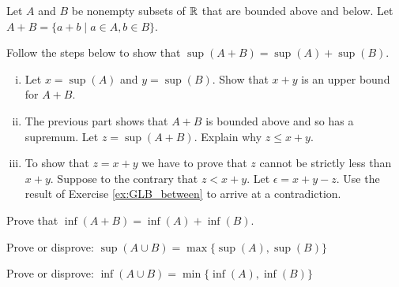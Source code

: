 \item Let $A$ and $B$ be nonempty subsets of $\mathbb{R}$ that are bounded above and below. Let $A+B = \{a+b \mid a \in A, b \in B\}$. 

\ba

\item Follow the steps below to show that $\sup(A+B) = \sup(A) + \sup(B)$.
	\begin{enumerate}[i.]
	\item Let $x = \sup(A)$ and $y = \sup(B)$. Show that $x+y$ is an upper bound for $A+B$. 
	
	\item The previous part shows that $A+B$ is bounded above and so has a supremum. Let $z = \sup(A+B)$. Explain why $z \leq x+y$. 
	
	\item To show that $z = x+y$ we have to prove that $z$ cannot be strictly less than $x+y$. Suppose to the contrary that $z < x+y$. Let $\epsilon = x+y-z$. Use the result of Exercise \ref{ex:GLB_between} to arrive at a contradiction.
	
	\end{enumerate}

\item Prove that $\inf(A+B) = \inf(A) + \inf(B)$.

\item Prove or disprove: $\sup(A \cup B) = \max\{\sup(A), \sup(B)\}$

\item Prove or disprove: $\inf(A \cup B) = \min\{\inf(A), \inf(B)\}$

\ea

